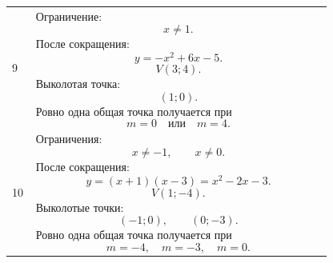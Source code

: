 \documentclass[a4paper,12pt]{article}
\begin{document}
\begin{longtable}{@{}p{0.07\linewidth}p{0.87\linewidth}@{}}
  9 &
  Ограничение:
  \[
    x\ne 1.
  \]
  После сокращения:
  \[
    y=-x^2+6x-5.
  \]
  \[
    V(3;4).
  \]
  Выколотая точка:
  \[
    (1;0).
  \]
  Ровно одна общая точка получается при
  \[
    \boxed{m=0\quad\text{или}\quad m=4}.
  \]
  \\

  10 &
  Ограничения:
  \[
    x\ne -1,\qquad x\ne 0.
  \]
  После сокращения:
  \[
    y=(x+1)(x-3)=x^2-2x-3.
  \]
  \[
    V(1;-4).
  \]
  Выколотые точки:
  \[
    (-1;0),\qquad(0;-3).
  \]
  Ровно одна общая точка получается при
  \[
    \boxed{m=-4,\quad m=-3,\quad m=0}.
  \]
  \\

\end{longtable}

\normalsize
\end{document}
